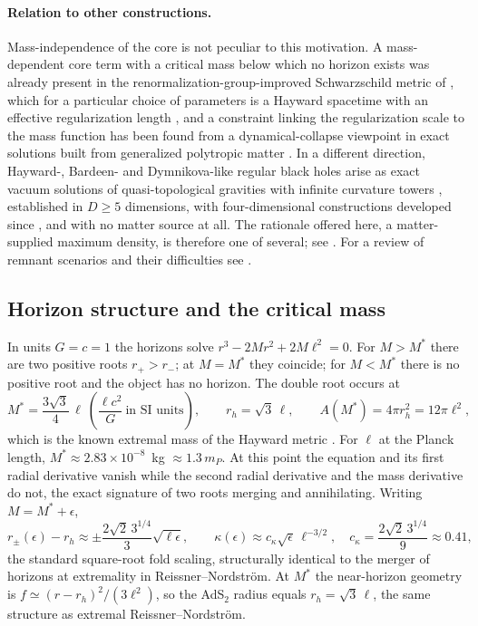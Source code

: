 \documentclass[11pt]{article}
\begin{document}
\paragraph{Relation to other constructions.}
Mass-independence of the core is not peculiar to this motivation. A mass-dependent core term with a critical mass below which no horizon exists was already present in the renormalization-group-improved Schwarzschild metric of \citet{BonannoReuter2000}, which for a particular choice of parameters is a Hayward spacetime with an effective regularization length \citep{BorissovaCarballoRubio2026}, and a constraint linking the regularization scale to the mass function has been found from a dynamical-collapse viewpoint in exact solutions built from generalized polytropic matter \citep{KLV2026}. In a different direction, Hayward-, Bardeen- and Dymnikova-like regular black holes arise as exact vacuum solutions of quasi-topological gravities with infinite curvature towers \citep{BuenoCanoHennigar2025}, established in $D\ge5$ dimensions, with four-dimensional constructions developed since \citep{BuenoNonPoly2025,BorissovaCarballoRubio4D2026}, and with no matter source at all. The rationale offered here, a matter-supplied maximum density, is therefore one of several; see \citet{PaperB}. For a review of remnant scenarios and their difficulties see \citet{ChenOngYeom2015}.

\subsection{Horizon structure and the critical mass}

In units $G=c=1$ the horizons solve $r^3-2Mr^2+2M\ell^2=0$. For $M>M^*$ there are two positive roots $r_+>r_-$; at $M=M^*$ they coincide; for $M<M^*$ there is no positive root and the object has no horizon. The double root occurs at
\begin{equation}
M^*=\frac{3\sqrt3}{4}\,\ell\ \left(\frac{\ell c^2}{G}\ \text{in SI units}\right),\qquad r_h=\sqrt3\,\ell,\qquad A(M^*)=4\pi r_h^2=12\pi\ell^2,
\end{equation}
which is the known extremal mass of the Hayward metric \citep{Hayward2006,KimNam2021}. For $\ell$ at the Planck length, $M^*\approx2.83\times10^{-8}$~kg $\approx1.3\,m_P$. At this point the equation and its first radial derivative vanish while the second radial derivative and the mass derivative do not, the exact signature of two roots merging and annihilating. Writing $M=M^*+\epsilon$,
\begin{equation}
r_\pm(\epsilon)-r_h\approx\pm\frac{2\sqrt2\,3^{1/4}}{3}\sqrt{\ell\epsilon},\qquad \kappa(\epsilon)\approx c_\kappa\sqrt{\epsilon}\,\ell^{-3/2},\quad c_\kappa=\frac{2\sqrt2\,3^{1/4}}{9}\approx0.41,
\label{eq:fold}
\end{equation}
the standard square-root fold scaling, structurally identical to the merger of horizons at extremality in Reissner--Nordstr\"om. At $M^*$ the near-horizon geometry is $f\simeq(r-r_h)^2/(3\ell^2)$, so the AdS$_2$ radius equals $r_h=\sqrt3\,\ell$, the same structure as extremal Reissner--Nordstr\"om.
\end{document}
